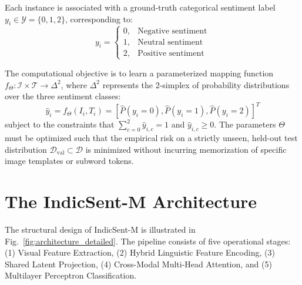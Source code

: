 \documentclass[10pt,journal,compsoc]{IEEEtran}
\begin{document}
Each instance is associated with a ground-truth categorical sentiment label $y_i \in \mathcal{Y} = \{0, 1, 2\}$, corresponding to:
\begin{equation}
    y_i = \begin{cases}
        0, & \text{Negative sentiment} \\
        1, & \text{Neutral sentiment} \\
        2, & \text{Positive sentiment}
    \end{cases}
\end{equation}

The computational objective is to learn a parameterized mapping function $f_\Theta: \mathcal{I} \times \mathcal{T} \to \Delta^2$, where $\Delta^2$ represents the 2-simplex of probability distributions over the three sentiment classes:
\begin{equation}
    \hat{y}_i = f_\Theta(I_i, T_i) = [\hat{P}(y_i=0), \hat{P}(y_i=1), \hat{P}(y_i=2)]^T
\end{equation}
subject to the constraints that $\sum_{c=0}^2 \hat{y}_{i,c} = 1$ and $\hat{y}_{i,c} \ge 0$. The parameters $\Theta$ must be optimized such that the empirical risk on a strictly unseen, held-out test distribution $\mathcal{D}_{\text{val}} \subset \mathcal{D}$ is minimized without incurring memorization of specific image templates or subword tokens.

\section{The IndicSent-M Architecture}
\label{sec:methodology}

The structural design of IndicSent-M is illustrated in Fig.~\ref{fig:architecture_detailed}. The pipeline consists of five operational stages: (1) Visual Feature Extraction, (2) Hybrid Linguistic Feature Encoding, (3) Shared Latent Projection, (4) Cross-Modal Multi-Head Attention, and (5) Multilayer Perceptron Classification.
\end{document}
